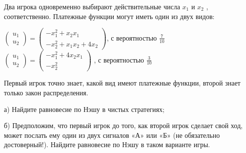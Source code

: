 \begin{problem}

Два игрока одновременно выбирают действительные числа  $x_{1} $  и  $x_{2} $ , соответственно.
Платежные функции могут иметь один из двух видов:

 $\left(\begin{array}{l} {u_{1} } \\ {u_{2} } \end{array}\right)=\left(\begin{array}{l} {-x_{1}^{2} +x_{2} x_{1} } \\ {-x_{2}^{2} +x_{1} x_{2} +4x_{2} } \end{array}\right)$, с вероятностью  $\frac{7}{10} $ \\
 $\left(\begin{array}{l} {u_{1} } \\ {u_{2} } \end{array}\right)=\left(\begin{array}{l} {-x_{1}^{2} +4x_{2} x_{1} } \\ {-x_{2}^{2} } \end{array}\right)$ , с вероятностью  $\frac{3}{10} $ \par
Первый игрок точно знает, какой вид имеют платежные функции, второй знает только закон распределения.\par
а)	Найдите равновесие по Нэшу в чистых стратегиях;\par
б) Предположим, что первый игрок до того, как второй игрок сделает свой ход, может послать ему один из двух сигналов «А» или «Б» (не обязательно достоверный!). Найдите равновесие по Нэшу в таком варианте игры.\par



\begin{sol}

\end{sol}
\end{problem}





